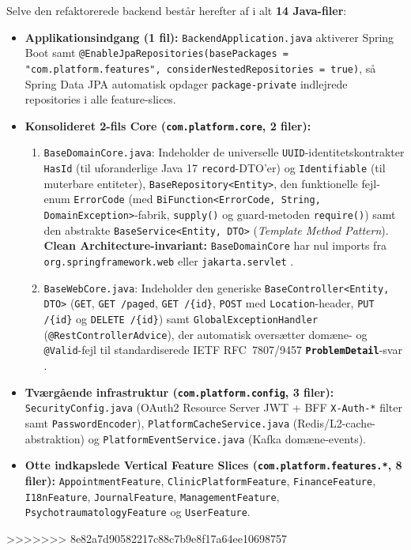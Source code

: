 \documentclass[11pt,a4paper]{article}
\begin{document}
\begin{table}[htbp]
Selve den refaktorerede backend består herefter af i alt \textbf{14 Java-filer}:
\begin{itemize}[noitemsep]
    \item \textbf{Applikationsindgang (1 fil):} \texttt{BackendApplication.java} aktiverer Spring Boot samt \texttt{@EnableJpaRepositories(basePackages = "com.platform.features", considerNestedRepositories = true)}, så Spring Data JPA automatisk opdager \texttt{package-private} indlejrede repositories i alle feature-slices.
    \item \textbf{Konsolideret 2-fils Core (\texttt{com.platform.core}, 2 filer):}
    \begin{enumerate}[noitemsep]
        \item \texttt{BaseDomainCore.java}: Indeholder de universelle \texttt{UUID}-identitetskontrakter \texttt{HasId} (til uforanderlige Java 17 \texttt{record}-DTO'er) og \texttt{Identifiable} (til muterbare entiteter), \texttt{BaseRepository<Entity>}, den funktionelle fejl-enum \texttt{ErrorCode} (med \texttt{BiFunction<ErrorCode, String, DomainException>}-fabrik, \texttt{supply()} og guard-metoden \texttt{require()}) samt den abstrakte \texttt{BaseService<Entity, DTO>} (\textit{Template Method Pattern}). \textbf{Clean Architecture-invariant:} \texttt{BaseDomainCore} har nul imports fra \texttt{org.springframework.web} eller \texttt{jakarta.servlet} \cite{martin2017}.
        \item \texttt{BaseWebCore.java}: Indeholder den generiske \texttt{BaseController<Entity, DTO>} (\texttt{GET}, \texttt{GET /paged}, \texttt{GET /\{id\}}, \texttt{POST} med \texttt{Location}-header, \texttt{PUT /\{id\}} og \texttt{DELETE /\{id\}}) samt \texttt{GlobalExceptionHandler} (\texttt{@RestControllerAdvice}), der automatisk oversætter domæne- og \texttt{@Valid}-fejl til standardiserede IETF RFC~7807/9457 \textbf{\texttt{ProblemDetail}}-svar \cite{rfc9457}.
    \end{enumerate}
    \item \textbf{Tværgående infrastruktur (\texttt{com.platform.config}, 3 filer):} \texttt{SecurityConfig.java} (OAuth2 Resource Server JWT + BFF \texttt{X-Auth-*} filter samt \texttt{PasswordEncoder}), \texttt{PlatformCacheService.java} (Redis/L2-cache-abstraktion) og \texttt{PlatformEventService.java} (Kafka domæne-events).
    \item \textbf{Otte indkapslede Vertical Feature Slices (\texttt{com.platform.features.*}, 8 filer):} \texttt{AppointmentFeature}, \texttt{ClinicPlatformFeature}, \texttt{FinanceFeature}, \texttt{I18nFeature}, \texttt{JournalFeature}, \texttt{ManagementFeature}, \texttt{PsychotraumatologyFeature} og \texttt{UserFeature}.
\end{itemize}
>>>>>>> 8e82a7d90582217c88c7b9e8f17a64ee10698757


\end{table}
\end{document}
